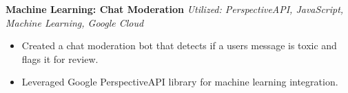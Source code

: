 {\textbf{Machine Learning: Chat Moderation}} {\sl Utilized: PerspectiveAPI, JavaScript, Machine Learning, Google Cloud} \\
\begin{itemize} \itemsep 1pt
	\item Created a chat moderation bot that detects if a users message is toxic and flags it for review.
	\item Leveraged Google PerspectiveAPI library for machine learning integration.
\end{itemize}
\vspace*{2mm}